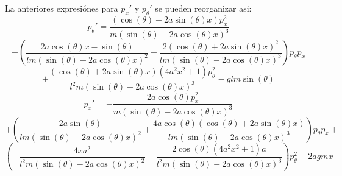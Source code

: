 \documentclass[letterpaper,10pt]{article}
\begin{document}
La anteriores expresi\'ones para $p_x'$ y $p_\theta'$ se pueden reorganizar asi:
$$
p_\theta'=\frac{(\cos (\theta )+2 a \sin (\theta ) x) p_x^2}{m (\sin (\theta )-2 a \cos(\theta ) x)^3}$$ $$+\left(\frac{2 a \cos (\theta ) x-\sin (\theta )}{l m (\sin(\theta )-2 a \cos (\theta ) x)^2}-\frac{2 (\cos (\theta )+2 a \sin (\theta )x)^2}{l m (\sin (\theta )-2 a \cos (\theta ) x)^3}\right) p_{\theta }p_x$$ $$+\frac{(\cos (\theta )+2 a \sin (\theta ) x) \left(4 a^2 x^2+1\right)p_{\theta }^2}{l^2 m (\sin (\theta )-2 a \cos (\theta ) x)^3}-g l m \sin (\theta)
$$
$$
p_x'=-\frac{2 a \cos (\theta ) p_x^2}{m (\sin (\theta )-2 a \cos (\theta )
   x)^3}$$ $$+\left(\frac{2 a \sin (\theta )}{l m (\sin (\theta )-2 a \cos (\theta )
   x)^2}+\frac{4 a \cos (\theta ) (\cos (\theta )+2 a \sin (\theta ) x)}{l m (\sin
   (\theta )-2 a \cos (\theta ) x)^3}\right) p_{\theta } p_x+$$ $$\left(-\frac{4 x
   a^2}{l^2 m (\sin (\theta )-2 a \cos (\theta ) x)^2}-\frac{2 \cos (\theta ) \left(4
   a^2 x^2+1\right) a}{l^2 m (\sin (\theta )-2 a \cos (\theta ) x)^3}\right)
   p_{\theta }^2-2 a g m x
$$
\end{document}
